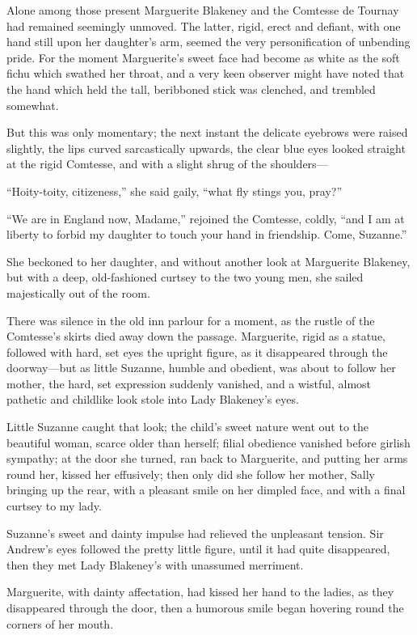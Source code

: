 \documentclass[paper=a5,BCOR=7mm,twoside,DIV=calc,12pt,usegeometry,chapterprefix,endperiod,headings=big]{scrbook}
\begin{document}
Alone among those present Marguerite Blakeney and the Comtesse de Tournay had remained seemingly unmoved. The latter, rigid, erect and defiant, with one hand still upon her daughter's arm, seemed the very personification of unbending pride. For the moment Marguerite's sweet face had become as white as the soft fichu which swathed her throat, and a very keen observer might have noted that the hand which held the tall, beribboned stick was clenched, and trembled somewhat.

But this was only momentary; the next instant the delicate eyebrows were raised slightly, the lips curved sarcastically upwards, the clear blue eyes looked straight at the rigid Comtesse, and with a slight shrug of the shoulders---

\enquote{Hoity-toity, citizeness,} she said gaily, \enquote{what fly stings you, pray?}

\enquote{We are in England now, Madame,} rejoined the Comtesse, coldly, \enquote{and I am at liberty to forbid my daughter to touch your hand in friendship. Come, Suzanne.}

She beckoned to her daughter, and without another look at Marguerite Blakeney, but with a deep, old-fashioned curtsey to the two young men, she sailed majestically out of the room.

There was silence in the old inn parlour for a moment, as the rustle of the Comtesse's skirts died away down the passage. Marguerite, rigid as a statue, followed with hard, set eyes the upright figure, as it disappeared through the doorway---but as little Suzanne, humble and obedient, was about to follow her mother, the hard, set expression suddenly vanished, and a wistful, almost pathetic and childlike look stole into Lady Blakeney's eyes.

Little Suzanne caught that look; the child's sweet nature went out to the beautiful woman, scarce older than herself; filial obedience vanished before girlish sympathy; at the door she turned, ran back to Marguerite, and putting her arms round her, kissed her effusively; then only did she follow her mother, Sally bringing up the rear, with a pleasant smile on her dimpled face, and with a final curtsey to my lady.

Suzanne's sweet and dainty impulse had relieved the unpleasant tension. Sir Andrew's eyes followed the pretty little figure, until it had quite disappeared, then they met Lady Blakeney's with unassumed merriment.

Marguerite, with dainty affectation, had kissed her hand to the ladies, as they disappeared through the door, then a humorous smile began hovering round the corners of her mouth.
\end{document}
